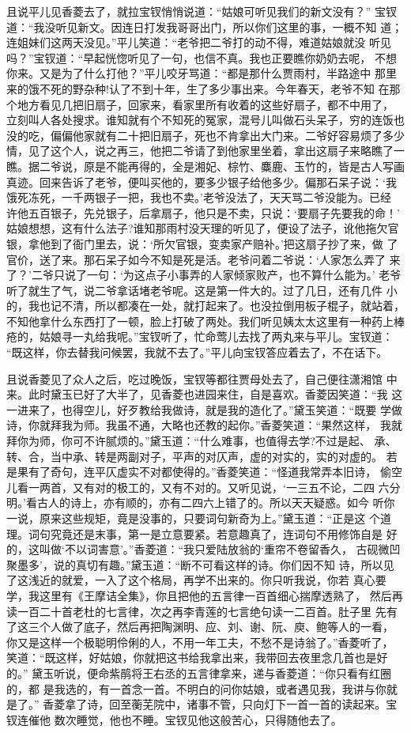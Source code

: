 且说平儿见香菱去了，就拉宝钗悄悄说道：“姑娘可听见我们的新文没有？”
宝钗道：“我没听见新文。因连日打发我哥哥出门，所以你们这里的事，一概不知
道；连姐妹们这两天没见。”平儿笑道：“老爷把二爷打的动不得，难道姑娘就没
听见吗？”宝钗道：“早起恍惚听见了一句，也信不真。我也正要瞧你奶奶去呢，
不想你来。又是为了什么打他？”平儿咬牙骂道：“都是那什么贾雨村，半路途中
那里来的饿不死的野杂种!认了不到十年，生了多少事出来。今年春天，老爷不知
在那个地方看见几把旧扇子，回家来，看家里所有收着的这些好扇子，都不中用了，
立刻叫人各处搜求。谁知就有个不知死的冤家，混号儿叫做石头呆子，穷的连饭也
没的吃，偏偏他家就有二十把旧扇子，死也不肯拿出大门来。二爷好容易烦了多少
情，见了这个人，说之再三，他把二爷请了到他家里坐着，拿出这扇子来略瞧了一
瞧。据二爷说，原是不能再得的，全是湘妃、棕竹、麋鹿、玉竹的，皆是古人写画
真迹。回来告诉了老爷，便叫买他的，要多少银子给他多少。偏那石呆子说：‘我
饿死冻死，一千两银子一把，我也不卖。’老爷没法了，天天骂二爷没能为。已经
许他五百银子，先兑银子，后拿扇子，他只是不卖，只说：‘要扇子先要我的命！’
姑娘想想，这有什么法子?谁知那雨村没天理的听见了，便设了法子，讹他拖欠官
银，拿他到了衙门里去，说：‘所欠官银，变卖家产赔补。’把这扇子抄了来，做
了官价，送了来。那石呆子如今不知是死是活。老爷问着二爷说：‘人家怎么弄了
来了？’二爷只说了一句：‘为这点子小事弄的人家倾家败产，也不算什么能为。’
老爷听了就生了气，说二爷拿话堵老爷呢。这是第一件大的。过了几日，还有几件
小的，我也记不清，所以都凑在一处，就打起来了。也没拉倒用板子棍子，就站着，
不知他拿什么东西打了一顿，脸上打破了两处。我们听见姨太太这里有一种药上棒
疮的，姑娘寻一丸给我呢。”宝钗听了，忙命莺儿去找了两丸来与平儿。宝钗道：
“既这样，你去替我问候罢，我就不去了。”平儿向宝钗答应着去了，不在话下。

且说香菱见了众人之后，吃过晚饭，宝钗等都往贾母处去了，自己便往潇湘馆
中来。此时黛玉已好了大半了，见香菱也进园来住，自是喜欢。香菱因笑道：“我
这一进来了，也得空儿，好歹教给我做诗，就是我的造化了。”黛玉笑道：“既要
学做诗，你就拜我为师。我虽不通，大略也还教的起你。”香菱笑道：“果然这样，
我就拜你为师，你可不许腻烦的。”黛玉道：“什么难事，也值得去学?不过是起、
承、转、合，当中承、转是两副对子，平声的对仄声，虚的对实的，实的对虚的。
若是果有了奇句，连平仄虚实不对都使得的。”香菱笑道：“怪道我常弄本旧诗，
偷空儿看一两首，又有对的极工的，又有不对的。又听见说，‘一三五不论，二四
六分明。’看古人的诗上，亦有顺的，亦有二四六上错了的。所以天天疑惑。如今
听你一说，原来这些规矩，竟是没事的，只要词句新奇为上。”黛玉道：“正是这
个道理。词句究竟还是末事，第一是立意要紧。若意趣真了，连词句不用修饰自是
好的，这叫做‘不以词害意’。”香菱道：“我只爱陆放翁的‘重帘不卷留香久，
古砚微凹聚墨多’，说的真切有趣。”黛玉道：“断不可看这样的诗。你们因不知
诗，所以见了这浅近的就爱，一入了这个格局，再学不出来的。你只听我说，你若
真心要学，我这里有《王摩诘全集》，你且把他的五言律一百首细心揣摩透熟了，
然后再读一百二十首老杜的七言律，次之再李青莲的七言绝句读一二百首。肚子里
先有了这三个人做了底子，然后再把陶渊明、应、刘、谢、阮、庾、鲍等人的一看，
你又是这样一个极聪明伶俐的人，不用一年工夫，不愁不是诗翁了。”香菱听了，
笑道：“既这样，好姑娘，你就把这书给我拿出来，我带回去夜里念几首也是好的。”
黛玉听说，便命紫鹃将王右丞的五言律拿来，递与香菱道：“你只看有红圈的，都
是我选的，有一首念一首。不明白的问你姑娘，或者遇见我，我讲与你就是了。”
香菱拿了诗，回至蘅芜院中，诸事不管，只向灯下一首一首的读起来。宝钗连催他
数次睡觉，他也不睡。宝钗见他这般苦心，只得随他去了。

